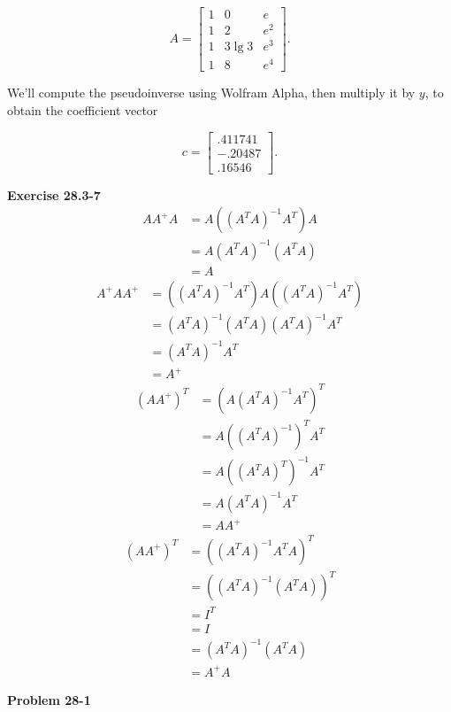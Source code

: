 \documentclass{article}
\begin{document}
\[ A = \left[ \begin{array}{ccc} 1 & 0 & e \\ 1 & 2 & e^2 \\ 1 & 3 \lg 3 & e^3 \\ 1 & 8 & e^4 \end{array} \right]. \]

We'll compute the pseudoinverse using Wolfram Alpha, then multiply it by $y$, to obtain the coefficient vector 

\[ c = \left[ \begin{array}{c} .411741 \\ -.20487 \\ .16546 \end{array} \right].\]

\noindent\textbf{Exercise 28.3-7}\\

\begin{align*}
AA^+A &= A ((A^TA)^{-1}A^T)A\\
&= A(A^TA)^{-1}(A^T A)\\
&= A
\end{align*}
\begin{align*}
A^+AA^+ &=  ((A^TA)^{-1}A^T)A((A^TA)^{-1}A^T)\\
 &= (A^TA)^{-1} (A^T A)(A^TA)^{-1} A^T\\ 
 &= (A^TA)^{-1} A^T\\
 &= A^+
\end{align*}
\begin{align*}
(AA^+)^T &= (A (A^TA)^{-1}A^T)^T\\
&= A ((A^T A)^{-1})^T A^T\\
&= A((A^T A)^T)^{-1} A^T\\
&= A(A^T A)^{-1} A^T\\
&= A A^+
\end{align*}
\begin{align*}
(AA^+)^T &= ((A^TA)^{-1}A^T A)^T\\
&= ((A^T A)^{-1}(A^T A))^T \\
&= I^T\\
&= I\\
&= (A^T A)^{-1} (A^TA)\\
&= A^+ A
\end{align*}



\noindent\textbf{Problem 28-1}\\
\end{document}
